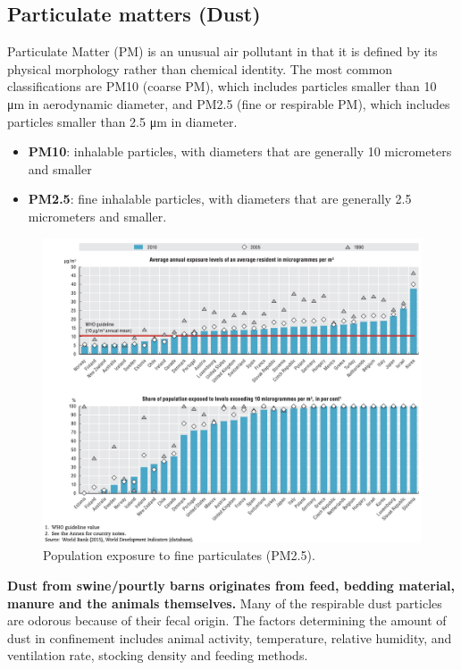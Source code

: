 \documentclass[]{book}
\providecommand{\tightlist}{%
  \setlength{\itemsep}{0pt}\setlength{\parskip}{0pt}}
\begin{document}
\hypertarget{particulate-matters-dust}{%
\subsection{Particulate matters (Dust)}\label{particulate-matters-dust}}

Particulate Matter (PM) is an unusual air pollutant in that it is defined by its physical morphology rather than chemical identity. The most common classifications are PM10 (coarse PM), which includes particles smaller than 10 μm in aerodynamic diameter, and
PM2.5 (fine or respirable PM), which includes particles smaller than 2.5 μm in diameter.

\begin{itemize}
\tightlist
\item
  \textbf{PM10}: inhalable particles, with diameters that are generally 10 micrometers and smaller
\item
  \textbf{PM2.5}: fine inhalable particles, with diameters that are generally 2.5 micrometers and smaller.
\end{itemize}

\begin{figure}

{\centering \includegraphics[width=1\linewidth]{figures/pm-oecd} 

}

\caption{Population exposure to fine particulates (PM2.5).}\label{fig:pm-oecd}
\end{figure}

\textbf{Dust from swine/pourtly barns originates from feed, bedding material, manure and the animals themselves.} Many of the respirable dust particles are odorous because of their fecal origin. The factors determining the amount of dust in confinement includes animal activity, temperature, relative humidity, and ventilation rate, stocking density and feeding methods.
\end{document}
